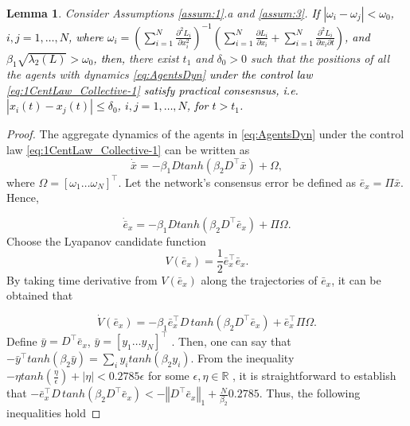 \documentclass[letterpaper, 10 pt, conference]{ieeeconf}  %
\newtheorem{lemma}[theorem]{Lemma}
\begin{document}
{\begin{lemma}
	\label{prop:consensustheorem}Consider Assumptions \ref{assum:1}.a and \ref{assum:3}. \textcolor{black}{If
		$\left|\omega_{i}-\omega_{j}\right|<\omega_{0}$, $i,j=1,\ldots,N$,
		where $\omega_{i}=\left(\sum_{i=1}^{N}\frac{\partial^{2}L_{i}}{\partial x_{i}^{2}}\right)^{-1}\left(\sum_{i=1}^{N}\frac{\partial L_{i}}{\partial x_{i}}+\sum_{i=1}^{N}\frac{\partial^{2}L_{i}}{\partial x_{i}\partial t}\right)$,
		and $\beta_{1}\sqrt{\lambda_{2}(L)}>\omega_{0}$, then, }there exist
	$t_{1}$ and $\delta_{0}>0$ such that the positions of all  the agents
	with dynamics \eqref{eq:AgentsDyn}\textcolor{red}{{} }\textcolor{black}{under
		the control law \eqref{eq:1CentLaw_Collective-1} satisfy practical
		consesnsus, i.e. $\left|x_{i}(t)-x_{j}(t)\right|\leq\delta_{0}$, $i,j=1,\ldots,N$,
		for $t>t_{1}$.}\end{lemma}
\begin{proof}
	The aggregate dynamics of the agents in \eqref{eq:AgentsDyn} under the control
	law \eqref{eq:1CentLaw_Collective-1} can be written as
	\begin{equation}
	\dot{\bar{x}}=-\beta_{1}Dtanh\left(\beta_{2}D^{\top}\bar{x}\right)+\Omega,\label{eq:ConsProp1}
	\end{equation}
	where $\varOmega=\left[\omega_{1}\ldots\omega_{N}\right]^{\top}$.
	Let the network's consensus error be defined as $\bar{e}_{x}=\Pi\bar{x}$.
	Hence,
	
	\begin{equation}
	\dot{\bar{e}}_{x}=-\beta_{1}Dtanh\left(\beta_{2}D^{\top}\bar{e}_{x}\right)+\Pi\Omega.\label{eq:ConsProp2}
	\end{equation}
	Choose the Lyapanov candidate function
	\begin{equation}
	V(\bar{e}_{x})=\frac{1}{2}\bar{e}_{x}^{\top}\bar{e}_{x}.\label{eq:ConsProp3}
	\end{equation}
	By taking time derivative from $V(\bar{e}_{x})$ along the trajectories
	of $\bar{e}_{x}$, it can be obtained that
	
	\begin{equation}
	\dot{V}(\bar{e}_{x})=-\beta_{1}\bar{e}_{x}^{\top}D\,tanh\left(\beta_{2}D^{\top}\bar{e}_{x}\right)+\bar{e}_{x}^{\top}\Pi\Omega.
	\end{equation}
	Define $\bar{y}=D^{\top}\bar{e}_{x}$, $\bar{y}=[y_{1}\ldots y_{N}]^{\top}$
	. Then, one can say that $-\bar{y}^{\top}tanh(\beta_{2}\bar{y})=\sum_{i}y_{i}tanh(\beta_{2}y_{i})$.
	From the inequality $-\eta tanh(\frac{\eta}{\epsilon})+\left|\eta\right|<0.2785\epsilon$
	for some $\epsilon,\eta\in\mathbb{{R}}$ \cite{polycarpou1993robust},
	it is straightforward to establish  that $-\bar{e}_{x}^{\top}D\,tanh\left(\beta_{2}D^{\top}\bar{e}_{x}\right)<-\left\Vert D^{\top}\bar{e}_{x}\right\Vert _{1}+\frac{N}{\beta_{2}}0.2785$.
	Thus, the following inequalities hold
	

\end{proof}}
\end{document}
